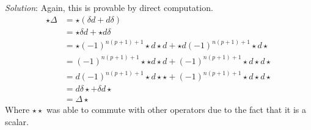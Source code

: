 \emph{Solution}:
Again, this is provable by direct computation.
\[
\begin{aligned}
\star\Delta &= \star\left(\delta d + d\delta\right)\\
            &= \star\delta d + \star d\delta\\
            &= \star(-1)^{n(p+1)+1}\star d \star d +
                \star d (-1)^{n(p+1)+1} \star d \star\\
            &= (-1)^{n(p+1)+1} \star \star d \star d +
                (-1)^{n(p+1)+1} \star d \star d \star\\
            &= d (-1)^{n(p+1)+1}\star d\star \star +
                (-1)^{n(p+1)+1} \star d \star d \star\\
            &= d \delta \star + \delta d \star\\
            &= \Delta\star
\end{aligned}
\]
Where $\star\star$ was able to commute with other operators due to the fact that
it is a scalar.
